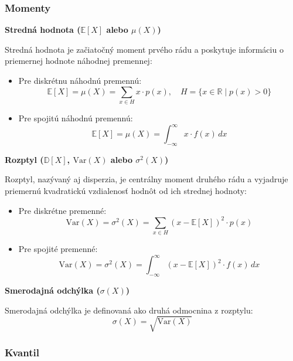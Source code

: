\subsubsection{Momenty}\label{subsubsection:momenty}

\textbf{Stredná hodnota ($\mathbb{E}[X]$ alebo $\mu(X)$)}

Stredná hodnota je začiatočný moment prvého rádu a poskytuje informáciu o priemernej hodnote náhodnej premennej:

\begin{itemize}
  \item Pre diskrétnu náhodnú premennú:
  \begin{equation}
    \mathbb{E}[X] = \mu(X) = \sum_{x \in H} x \cdot p(x), \quad H = \{ x \in \mathbb{R} \mid p(x) > 0 \}
  \end{equation}
  \item Pre spojitú náhodnú premennú:
  \begin{equation}
    \mathbb{E}[X] = \mu(X) = \int_{-\infty}^{\infty} x \cdot f(x) \, dx
  \end{equation}
\end{itemize}

\textbf{Rozptyl ($\mathbb{D}[X]$, $\mathrm{Var}(X)$ alebo $\sigma^2(X)$)}

Rozptyl, nazývaný aj disperzia, je centrálny moment druhého rádu a vyjadruje priemernú kvadratickú vzdialenosť hodnôt od ich strednej hodnoty:

\begin{itemize}
  \item Pre diskrétne premenné:
  \begin{equation}
    \mathrm{Var}(X) = \sigma^2(X) = \sum_{x \in H} (x - \mathbb{E}[X])^2 \cdot p(x)
  \end{equation}
  \item Pre spojité premenné:
  \begin{equation}
    \mathrm{Var}(X) = \sigma^2(X) = \int_{-\infty}^{\infty} (x - \mathbb{E}[X])^2 \cdot f(x) \, dx
  \end{equation}
\end{itemize}

\textbf{Smerodajná odchýlka ($\sigma(X)$)}

Smerodajná odchýlka je definovaná ako druhá odmocnina z rozptylu:
\begin{equation}
\sigma(X) = \sqrt{\mathrm{Var}(X)}
\end{equation}

\subsubsection{Kvantil}\label{subsubsection:kvantil}

